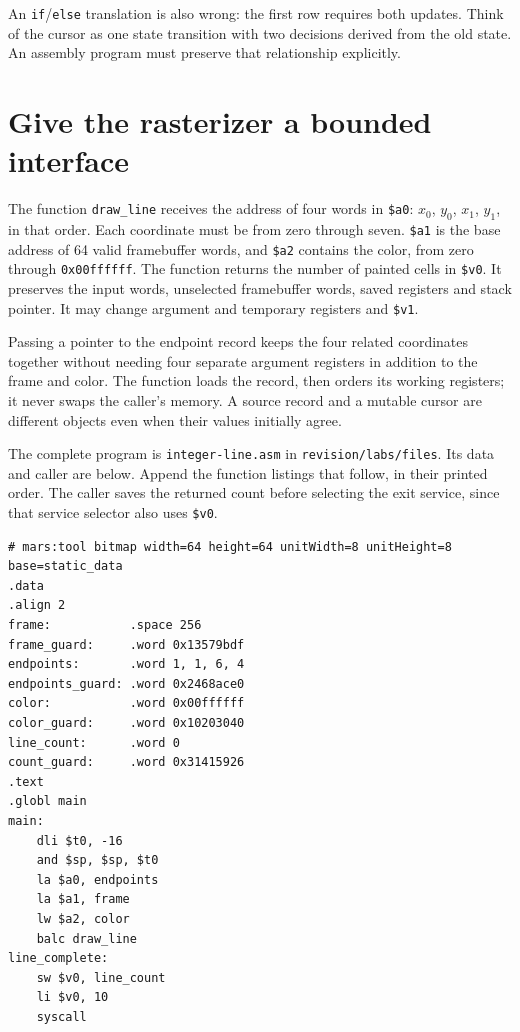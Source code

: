An \texttt{if}/\texttt{else} translation is also wrong: the first row requires both
updates. Think of the cursor as one state transition with two decisions derived
from the old state. An assembly program must preserve that relationship explicitly.

\section{Give the rasterizer a bounded interface}

The function \texttt{draw\_line} receives the address of four words in \texttt{\$a0}:
$x_0$, $y_0$, $x_1$, $y_1$, in that order. Each coordinate must be from zero through
seven. \texttt{\$a1} is the base address of 64 valid framebuffer words, and
\texttt{\$a2} contains the color, from zero through \texttt{0x00ffffff}. The function
returns the number of painted cells in \texttt{\$v0}. It preserves the input words,
unselected framebuffer words, saved registers and stack pointer. It may change
argument and temporary registers and \texttt{\$v1}.

Passing a pointer to the endpoint record keeps the four related coordinates
together without needing four separate argument registers in addition to the
frame and color. The function loads the record, then orders its working registers;
it never swaps the caller's memory. A source record and a mutable cursor are
different objects even when their values initially agree.

The complete program is \texttt{integer-line.asm} in \texttt{revision/labs/files}.
Its data and caller are below. Append the function listings that follow, in their
printed order. The caller saves the returned count before selecting the exit
service, since that service selector also uses \texttt{\$v0}.

\noindent\begin{minipage}{\linewidth}
  \begin{verbatim}
# mars:tool bitmap width=64 height=64 unitWidth=8 unitHeight=8 base=static_data
.data
.align 2
frame:           .space 256
frame_guard:     .word 0x13579bdf
endpoints:       .word 1, 1, 6, 4
endpoints_guard: .word 0x2468ace0
color:           .word 0x00ffffff
color_guard:     .word 0x10203040
line_count:      .word 0
count_guard:     .word 0x31415926
.text
.globl main
main:
    dli $t0, -16
    and $sp, $sp, $t0
    la $a0, endpoints
    la $a1, frame
    lw $a2, color
    balc draw_line
line_complete:
    sw $v0, line_count
    li $v0, 10
    syscall
\end{verbatim}
\end{minipage}

